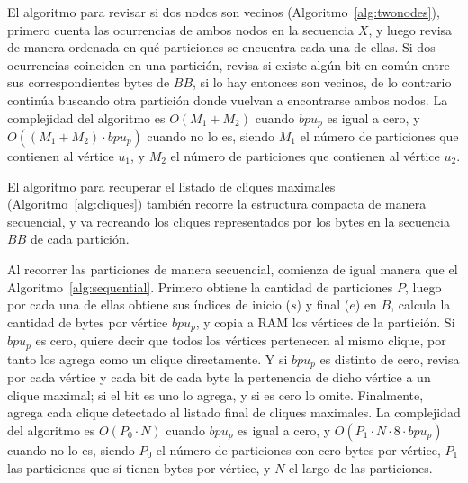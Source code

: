 El algoritmo para revisar si dos nodos son vecinos (Algoritmo~\ref{alg:twonodes}), primero cuenta las ocurrencias de ambos nodos en la secuencia $X$, y luego revisa de manera ordenada en qué particiones se encuentra cada una de ellas. Si dos ocurrencias coinciden en una partición, revisa si existe algún bit en común entre sus correspondientes bytes de $BB$, si lo hay entonces son vecinos, de lo contrario continúa buscando otra partición donde vuelvan a encontrarse ambos nodos. La complejidad del algoritmo es $O(M_{1} + M_{2})$ cuando $bpu_{p}$ es igual a cero, y $O((M_{1} + M_{2}) \cdot bpu_{p})$ cuando no lo es, siendo $M_{1}$ el número de particiones que contienen al vértice $u_{1}$, y $M_{2}$ el número de particiones que contienen al vértice $u_{2}$.

El algoritmo para recuperar el listado de cliques maximales (Algoritmo~\ref{alg:cliques}) también recorre la estructura compacta de manera secuencial, y va recreando los cliques representados por los bytes en la secuencia $BB$ de cada partición.

Al recorrer las particiones de manera secuencial, comienza de igual manera que el Algoritmo~\ref{alg:sequential}. Primero obtiene la cantidad de particiones $P$, luego por cada una de ellas obtiene sus índices de inicio ($s$) y final ($e$) en $B$, calcula la cantidad de bytes por vértice $bpu_{p}$, y copia a RAM los vértices de la partición. Si $bpu_{p}$ es cero, quiere decir que todos los vértices pertenecen al mismo clique, por tanto los agrega como un clique directamente. Y si $bpu_{p}$ es distinto de cero, revisa por cada vértice y cada bit de cada byte la pertenencia de dicho vértice a un clique maximal; si el bit es uno lo agrega, y si es cero lo omite. Finalmente, agrega cada clique detectado al listado final de cliques maximales. La complejidad del algoritmo es $O(P_{0} \cdot N)$ cuando $bpu_{p}$ es igual a cero, y $O(P_{1} \cdot N \cdot 8 \cdot bpu_{p})$ cuando no lo es, siendo $P_{0}$ el número de particiones con cero bytes por vértice, $P_{1}$ las particiones que sí tienen bytes por vértice, y $N$ el largo de las particiones.










